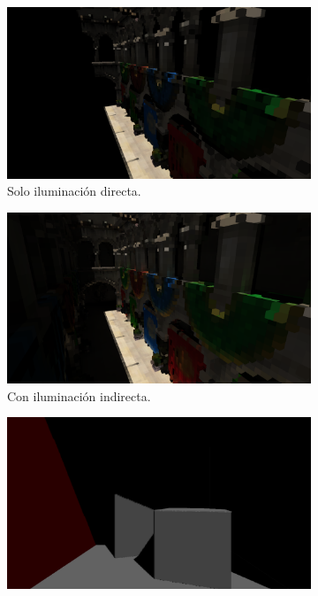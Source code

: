 \begin{figure}[H]
	\centering
	\begin{subfigure}[t]{0.49\textwidth}
		\centering
		\captionsetup{justification=centering}
		\caption*{Solo iluminación directa.}
		\includegraphics[width=\linewidth]{media/voxel_direct.png}
	\end{subfigure}%
	\hspace{0.01\textwidth}
	\begin{subfigure}[t]{0.49\textwidth}
		\centering
		\captionsetup{justification=centering}
		\caption*{Con iluminación indirecta.}
		\includegraphics[width=\linewidth]{media/voxel_gi.png}
	\end{subfigure}%
	\par\smallskip
	\begin{subfigure}[t]{0.49\textwidth}
		\centering
		\includegraphics[width=\linewidth]{media/c_voxel_direct.png}

\end{subfigure}
\end{figure}

